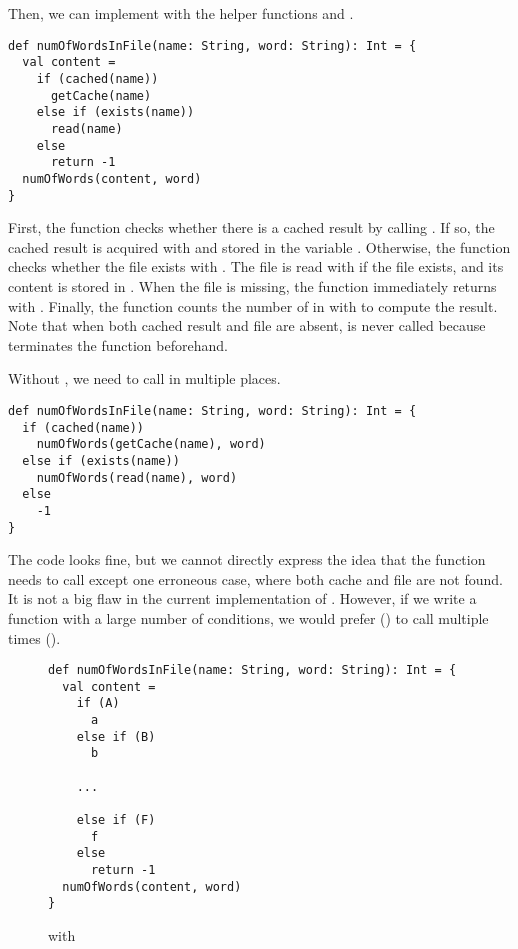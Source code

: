 Then, we can implement  with the helper functions and
.

\begin{verbatim}
def numOfWordsInFile(name: String, word: String): Int = {
  val content =
    if (cached(name))
      getCache(name)
    else if (exists(name))
      read(name)
    else
      return -1
  numOfWords(content, word)
}
\end{verbatim}

First, the function checks whether there is a cached result by calling .
If so, the cached result is acquired with  and stored in the variable
. Otherwise, the function checks whether the file exists with
. The file is read with  if the file exists, and its
content is stored in . When the file is missing, the function
immediately returns  with . Finally, the function
counts the number of  in  with  to
compute the result. Note that when both cached result and file are absent,
 is never called because  terminates the
function beforehand.

Without , we need to call  in multiple places.

\begin{verbatim}
def numOfWordsInFile(name: String, word: String): Int = {
  if (cached(name))
    numOfWords(getCache(name), word)
  else if (exists(name))
    numOfWords(read(name), word)
  else
    -1
}
\end{verbatim}

The code looks fine, but we cannot directly express the idea that the function needs to
call  except one erroneous case, where both cache and file are
not found. It is not a big flaw in the current implementation of
.
However, if we write a function with a large number of conditions, we would
prefer  () to call  multiple
times ().

\begin{figure}[t]
\begin{verbatim}
def numOfWordsInFile(name: String, word: String): Int = {
  val content =
    if (A)
      a
    else if (B)
      b

    ...

    else if (F)
      f
    else
      return -1
  numOfWords(content, word)
}
\end{verbatim}
\caption{ with }
\end{figure}

